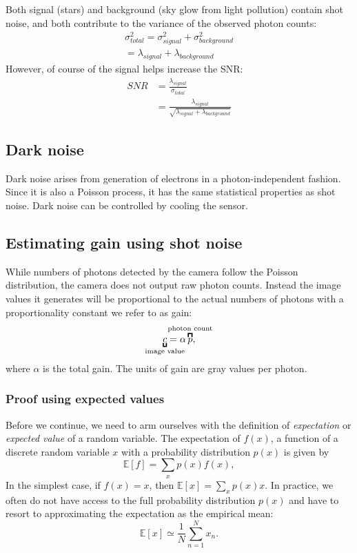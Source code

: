 \documentclass[a4paper]{report}
\newcommand{\nexercise}[0]{\arabic{exercises}\addtocounter{exercises}{1}}
\begin{document}
\begin{exercisebox}[frametitle={Exercise \nexercise: Why can’t we see the Milky Way from London?}]
Both signal (stars) and background (sky glow from light pollution) contain shot noise, and both contribute to the variance of the observed photon counts:
\begin{align}
\sigma_{total}^2 = \sigma_{signal}^2 + \sigma_{background}^2 \\
=\lambda_{signal} + \lambda_{background}
\end{align}
However, of course of the signal helps increase the SNR:
\begin{align}
SNR &= \frac{\lambda_{signal}}{\sigma_{total}} \\
    &= \frac{\lambda_{signal}}{\sqrt{\lambda_{signal} + \lambda_{background}}} 	
\end{align}
\end{exercisebox}

\subsection{Dark noise}
Dark noise arises from generation of electrons in a photon-independent fashion. 
Since it is also a Poisson process, it has the same statistical properties as shot noise. 
Dark noise can be controlled by cooling the sensor.

\subsection{Estimating gain using shot noise}
While numbers of photons detected by the camera follow the Poisson distribution, the camera does not output raw photon counts.
Instead the image values it generates will be proportional to the actual numbers of photons with a proportionality constant we refer to as gain:
\begin{equation}
	\underbracket{c}_{\mathclap{\text{image value}}} = \alpha \overbracket{p}^{\mathclap{\text{photon count}}},
\end{equation} 
where $\alpha$ is the total gain.
The units of gain are gray values per photon. 

\subsubsection{Proof using expected values}
Before we continue, we need to arm ourselves with the definition of \textit{expectation} or \textit{expected value} of a random variable. 
The expectation of $f(x)$, a function of a discrete random variable $x$ with a probability distribution $p(x)$ is given by
\begin{equation}
\mathbb {E} [f] = \sum _{x} p(x) f(x),
\end{equation}
In the simplest case, if $f(x) = x$, then $\mathbb {E} [x] = \sum _{x} p(x) x$. 
In practice, we often do not have access to the full probability distribution $p(x)$ and have to resort to approximating the expectation as the empirical mean:
\begin{equation}
\mathbb { E } [ x ] \simeq \frac { 1 } { N } \sum _ { n = 1 } ^ { N } x _{n}.
\end{equation}
\end{document}
